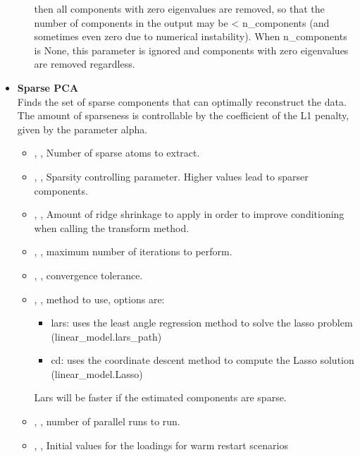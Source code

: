 \begin{itemize}
\begin{itemize}
		 then all components with zero eigenvalues are removed, so that the number of
		 components in the output may be < n\_components (and sometimes even zero due
		 to numerical instability). When n\_components is None, this parameter is
		 ignored and components with zero eigenvalues are removed regardless. 
	\end{itemize}
	\item \textbf{Sparse PCA} \\
	Finds the set of sparse components that can optimally reconstruct the data. The amount
	of sparseness is controllable by the coefficient of the L1 penalty, given by the
	parameter alpha.
	\begin{itemize}
		\item {}, , Number of
		sparse atoms to extract. 
		\item {}, , Sparsity controlling
		 parameter. Higher values lead to sparser components. 
		\item {}, , Amount of ridge
		 shrinkage to apply in order to improve conditioning when calling the transform
		 method. 
		\item {}, , maximum number of
		iterations to perform. 
		\item {}, , convergence tolerance.
		\item {}, , method to use,
		options are:
		\begin{itemize}
			\item lars: uses the least angle regression method to solve the lasso
			 problem (linear\_model.lars\_path)
			\item cd: uses the coordinate descent method to compute the Lasso
			solution (linear\_model.Lasso)
		\end{itemize}
		Lars will be faster if the estimated components are sparse. 
		\item {}, , number of parallel
		 runs to run. 
		\item {}, , Initial values for the loadings for warm restart scenarios

\end{itemize}
\end{itemize}
